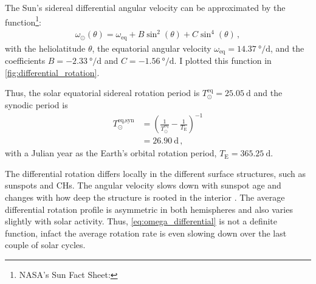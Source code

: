 The Sun's sidereal differential angular velocity can be approximated by the function\footnote{NASA's Sun Fact Sheet: }:
\begin{align}
	\omega_\odot(\theta) = \omega_\text{eq} + B \sin^2(\theta) + C \sin^4(\theta)	\,,	\label{eq:omega_differential}
\end{align}
with the heliolatitude $\theta$, the equatorial angular velocity $\omega_\text{eq} = \SI{14.37}{\degree\per\day}$, and the coefficients $B = \SI{-2.33}{\degree\per\day}$ and $C = \SI{-1.56}{\degree\per\day}$. I plotted this function in \autoref{fig:differential_rotation}.
\begin{figure}[htb]
\end{figure}
Thus, the solar equatorial sidereal rotation period is $T_\odot^\text{eq} = \SI{25.05}{\day}$ and the synodic period is
\begin{align}
	T_\odot^\text{eq,syn} &= \left(\frac{1}{T_\odot^\text{eq}} - \frac{1}{T_\text{E}}\right)^{-1}\\
	&= \SI{26.90}{\day}	\,,	\nonumber
\end{align}
with a Julian year as the Earth's orbital rotation period, $T_\text{E} = \SI{365.25}{\day}$.

The differential rotation differs locally in the different surface structures, such as sunspots and CHs. The angular velocity slows down with sunspot age and changes with how deep the structure is rooted in the interior \citep{Pulkkinen1998}. The average differential rotation profile is asymmetric in both hemispheres and also varies slightly with solar activity. Thus, \autoref{eq:omega_differential} is not a definite function, infact the average rotation rate is even slowing down over the last couple of solar cycles.

